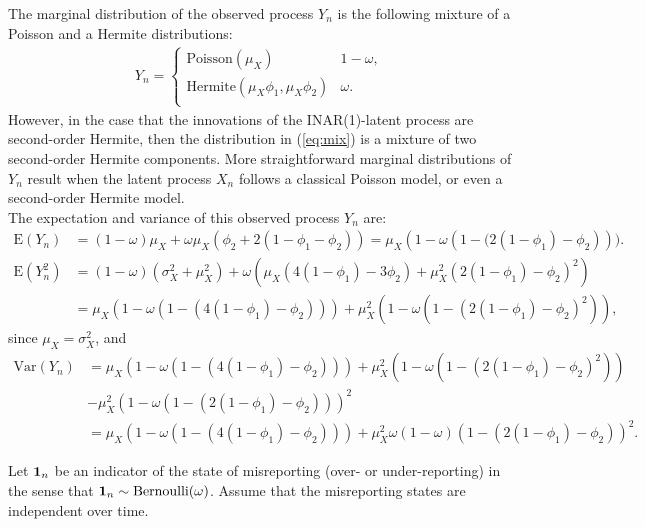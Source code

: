 \documentclass[11pt,a4paper]{article}
\begin{document}
\medskip

\noindent The marginal distribution of the observed process $Y_n$ is the following mixture of a Poisson and a Hermite distributions:
\begin{align}\label{eq:mix}
Y_n=\begin{cases} 
\textrm{Poisson}(\mu_X) &  1-\omega, \\
\textrm{Hermite}\left(\mu_X\phi_1,\mu_X\phi_2\right) &  \omega. \\
\end{cases}
\end{align}
However, in the case that the innovations of the INAR(1)-latent process are second-order Hermite, then the distribution in (\ref{eq:mix}) is a mixture of two second-order Hermite components. More straightforward marginal distributions of $Y_n$ result when the latent process $X_n$ follows a classical Poisson model, or even a second-order Hermite model.\\ 
The expectation and variance of this observed process $Y_n$ are:
\begin{align*}
\textrm{E}(Y_n)&=(1-\omega)\mu_X+\omega\mu_X\left(\phi_2+2(1-\phi_1-\phi_2)\right)=\mu_X(1-\omega\left(1-(2(1-\phi_1)-\phi_2\right))).\\
\textrm{E}(Y_n^2)&=(1-\omega)(\sigma_X^2+\mu_X^2)+\omega \left(\mu_X(4(1-\phi_1)-3\phi_2)+\mu_X^2(2(1-\phi_1)-\phi_2)^2\right)\\&=\mu_X\left(1-\omega\left(1-\left(4(1-\phi_1)-\phi_2\right)\right)\right)+\mu_X^2\left(1-\omega\left(1-(2(1-\phi_1)-\phi_2)^2\right)\right),
\end{align*}
since $\mu_X=\sigma_X^2$, and 
\begin{align*}
\textrm{Var}(Y_n)&=\mu_X\left(1-\omega\left(1-\left(4\left(1-\phi_1\right)-\phi_2\right)\right)\right)+\mu_X^2\left(1-\omega\left(1-\left(2\left(1-\phi_1\right)-\phi_2\right)^2\right)\right)\\ &-\mu_X^2\left(1-\omega\left(1-\left(2\left(1-\phi_1\right)-\phi_2\right)\right)\right)^2\\&=\mu_X\left(1-\omega\left(1-\left(4\left(1-\phi_1\right)-\phi_2\right)\right)\right)+\mu_X^2\omega(1-\omega)\left(1-\left(2\left(1-\phi_1\right)-\phi_2\right)\right)^2. 
\end{align*}

\noindent Let ${\bf 1}_n$ be an indicator of the state of misreporting (over- or under-reporting) in the sense that ${\bf 1}_n \sim \textrm{Bernoulli}(\omega)$. Assume that the misreporting states are independent over time. 
\end{document}
